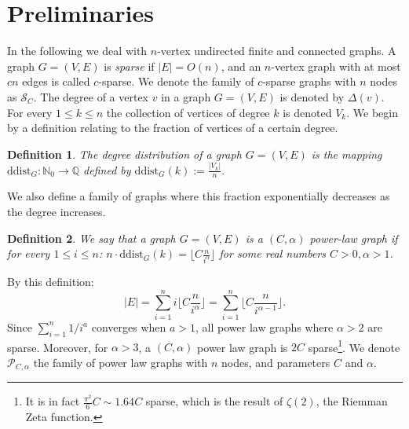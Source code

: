 \documentclass{article}
\newtheorem{definition}{Definition}
\theoremstyle{remark}
\begin{document}
\section{Preliminaries}
In the following we deal with $n$-vertex undirected finite and connected graphs.
A graph $G=(V,E)$ is \emph{sparse} if $\vert E \vert = O(n)$, and an  $n$-vertex graph with at  most $cn$ edges is called $c$-sparse.
We  denote the family of $c$-sparse graphs with $n$ nodes as   $\mathcal{S}_C$.
The degree of a vertex $v$ in a graph $G=(V,E)$ is denoted by $\Delta(v)$.
For every $1 \leq k \leq n$  the collection of vertices of degree $k$ is denoted $V_k$.
We begin by a definition relating to the fraction of vertices of a certain degree.
\begin{definition}
The \emph{degree distribution} of a graph $G = (V,E)$ is the mapping 
$\mathrm{ddist}_G : \mathbb{N}_0 \longrightarrow \mathbb{Q}$
defined by $\mathrm{ddist}_G (k) := 
\frac{\vert V_k \vert} {n}.$
\end{definition}

We also define a family of graphs where this fraction exponentially decreases as the degree increases.
\begin{definition}
We say that a graph  $G=(V,E)$ is a  $(C,\alpha)$ \emph{power-law graph} if for every $1 \leq i \leq n$:
$n \cdot \mathrm{ddist}_G(k) = \lfloor C \frac{n}{i^{\alpha}} \rfloor $ for some real numbers $C > 0,\alpha > 1$.
\end{definition}
By this definition:
$$|E| = \sum_{i=1}^{n} i \lfloor C \frac{n}{i^{\alpha}} \rfloor= \sum_{i=1}^{n}  \lfloor C \frac{n}{i^{\alpha-1}} \rfloor.$$
Since $\sum_{i=1}^n 1/i^{a}$ converges when $a>1$, all power law graphs where $\alpha>2$ are sparse.
Moreover, for $\alpha>3$,  a $(C,\alpha)$ power law graph is $2C$ sparse\footnote{It is in fact $\frac{\pi^2}{6}C \sim 1.64C$ sparse, which is the result of $\zeta(2)$, the Riemman Zeta function.}.
We denote  $\mathcal{P}_{C,\alpha}$ the family of power law graphs with $n$ nodes, and parameters  $C$ and $\alpha$.

\end{document}
